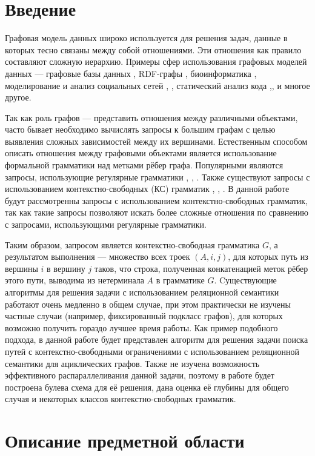 \documentclass{spbau-diploma}
\begin{document}
\section*{Введение}
Графовая модель данных широко используется для решения
задач, данные в которых тесно связаны между собой
отношениями. Эти отношения как правило составляют сложную
иерархию. Примеры сфер использования графовых моделей
данных --- графовые базы данных \cite{GraphDB}, RDF-графы \cite{RDF}, биоинформатика \cite{Bio},
моделирование и анализ социальных сетей \cite{Warcha2012UsingNG}, \cite{social}, статический
анализ кода \cite{Static},\cite{Reps},\cite{DyckTrees} и многое другое. \par
Так как роль графов ---
представить отношения между различными объектами,
часто бывает необходимо вычислять запросы к большим графам с целью
выявления сложных зависимостей между их вершинами. Естественным способом описать отношения
между графовыми объектами является использование
формальной грамматики над метками рёбер графа. Популярными являются запросы, использующие регулярные грамматики \cite{Reg1}, \cite{Reg2}, \cite{Reg3}. Также существуют запросы с использованием
контекстно-свободных (КС) грамматик \cite{HellConj}, \cite{HellingsCFPQ}, \cite{MatrixMult}. В данной работе будут рассмотренны запросы с использованием контекстно-свободных грамматик, так как такие запросы позволяют искать более сложные отношения по сравнению с запросами, использующими регулярные грамматики. \par
 Таким образом, запросом является контекстно-свободная грамматика $G$, а результатом выполнения --- множество всех троек
$(A, i, j)$, для которых путь из вершины $i$ в вершину $j$ таков, что строка, полученная конкатенацией меток рёбер этого пути, выводима из нетерминала $A$ в грамматике $G$. Cуществующие алгоритмы для решения задачи с использованием реляционной семантики работают очень  медленно в общем случае, при этом практически не изучены частные случаи (например, фиксированный подкласс графов),  для которых возможно получить гораздо лучшее время работы. Как пример подобного подхода, в данной работе будет представлен алгоритм для решения задачи поиска путей с контекстно-свободными ограничениями с использованием реляционной семантики для ациклических графов. Также не изучена возможность эффективного распараллеливания данной задачи, поэтому в работе будет построена булева схема для её решения, дана оценка её глубины для общего случая и некоторых классов контекстно-свободных грамматик. 


\section{Описание предметной области}
\end{document}
